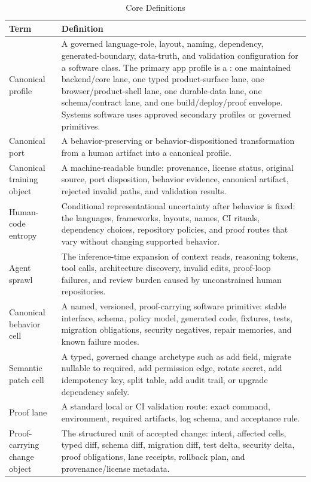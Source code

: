 \begin{table}[t]
\caption{Core Definitions}
\label{tab:definitions}
\centering
\footnotesize
\begin{tabularx}{\textwidth}{p{}X}
\toprule
Term & Definition \\
\midrule
Canonical profile & A governed language-role, layout, naming, dependency, generated-boundary, data-truth, and validation configuration for a software class. The primary app profile is a \canonprofile{}: one maintained backend/core lane, one typed product-surface lane, one browser/product-shell lane, one durable-data lane, one schema/contract lane, and one build/deploy/proof envelope. Systems software uses approved secondary profiles or governed primitives. \\
Canonical port & A behavior-preserving or behavior-dispositioned transformation from a human artifact into a canonical profile. \\
Canonical training object & A machine-readable bundle: provenance, license status, original source, port disposition, behavior evidence, canonical artifact, rejected invalid paths, and validation results. \\
Human-code entropy & Conditional representational uncertainty after behavior is fixed: the languages, frameworks, layouts, names, CI rituals, dependency choices, repository policies, and proof routes that vary without changing supported behavior. \\
Agent sprawl & The inference-time expansion of context reads, reasoning tokens, tool calls, architecture discovery, invalid edits, proof-loop failures, and review burden caused by unconstrained human repositories. \\
Canonical behavior cell & A named, versioned, proof-carrying software primitive: stable interface, schema, policy model, generated code, fixtures, tests, migration obligations, security negatives, repair memories, and known failure modes. \\
Semantic patch cell & A typed, governed change archetype such as add field, migrate nullable to required, add permission edge, rotate secret, add idempotency key, split table, add audit trail, or upgrade dependency safely. \\
Proof lane & A standard local or CI validation route: exact command, environment, required artifacts, log schema, and acceptance rule. \\
Proof-carrying change object & The structured unit of accepted change: intent, affected cells, typed diff, schema diff, migration diff, test delta, security delta, proof obligations, lane receipts, rollback plan, and provenance/license metadata. \\

\end{tabularx}
\end{table}
